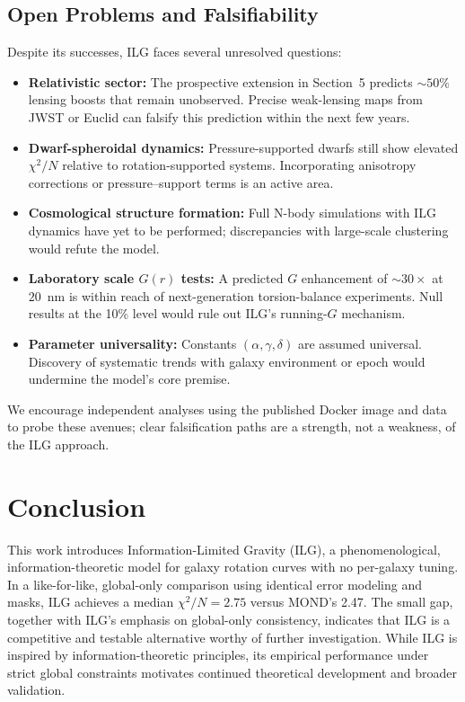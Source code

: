 \documentclass[12pt,a4paper]{article}
\begin{document}
\subsection{Open Problems and Falsifiability}

Despite its successes, ILG faces several unresolved questions:

\begin{itemize}
  \item \textbf{Relativistic sector:} The prospective extension in Section~5 predicts $\sim 50\%$ lensing boosts that remain unobserved.  Precise weak-lensing maps from JWST or Euclid can falsify this prediction within the next few years.
  \item \textbf{Dwarf-spheroidal dynamics:} Pressure-supported dwarfs still show elevated $\chi^2/N$ relative to rotation-supported systems.  Incorporating anisotropy corrections or pressure–support terms is an active area.
  \item \textbf{Cosmological structure formation:} Full N-body simulations with ILG dynamics have yet to be performed; discrepancies with large-scale clustering would refute the model.
  \item \textbf{Laboratory scale $G(r)$ tests:} A predicted $G$ enhancement of $\sim 30\times$ at $20$~nm is within reach of next-generation torsion-balance experiments.  Null results at the 10\% level would rule out ILG's running-$G$ mechanism.
  \item \textbf{Parameter universality:} Constants $(\alpha, \gamma, \delta)$ are assumed universal.  Discovery of systematic trends with galaxy environment or epoch would undermine the model's core premise.
\end{itemize}

We encourage independent analyses using the published Docker image and data to probe these avenues; clear falsification paths are a strength, not a weakness, of the ILG approach.

\section{Conclusion}

This work introduces Information-Limited Gravity (ILG), a phenomenological, information-theoretic model for galaxy rotation curves with no per-galaxy tuning. In a like-for-like, global-only comparison using identical error modeling and masks, ILG achieves a median $\chi^2/N = 2.75$ versus MOND's 2.47. The small gap, together with ILG's emphasis on global-only consistency, indicates that ILG is a competitive and testable alternative worthy of further investigation.
While ILG is inspired by information-theoretic principles, its empirical performance under strict global constraints motivates continued theoretical development and broader validation.
\end{document}
